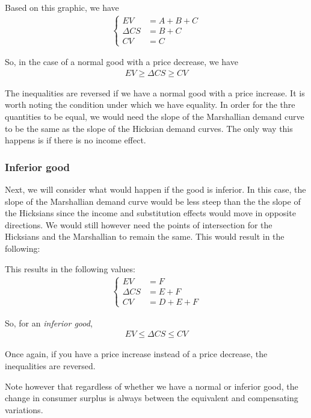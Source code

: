 Based on this graphic, we have
\begin{align*}
    \begin{cases}
        EV &= A + B + C \\
        \Delta CS &= B + C \\
        CV &= C
    \end{cases}
\end{align*}

So, in the case of a normal good with a price decrease, we have
\begin{align*}
    EV \geq \Delta CS \geq CV
\end{align*}

The inequalities are reversed if we have a normal good with a price increase. It is worth noting the condition under which we have equality. In order for the thre quantities to be equal, we would need the slope of the Marshallian demand curve to be the same as the slope of the Hicksian demand curves. The only way this happens is if there is no income effect.

\subsubsection*{Inferior good}
Next, we will consider what would happen if the good is inferior. In this case, the slope of the Marshallian demand curve would be less steep than the the slope of the Hicksians since the income and substitution effects would move in opposite directions. We would still however need the points of intersection for the Hicksians and the Marshallian to remain the same. This would result in the following:

This results in the following values:
\begin{align*}
    \begin{cases}
        EV &= F \\
        \Delta CS &= E + F \\
        CV &= D + E + F
    \end{cases}
\end{align*}

So, for an \emph{inferior good}, 
\begin{align*}
    EV \leq \Delta CS \leq CV
\end{align*}

Once again, if you have a price increase instead of a price decrease, the inequalities are reversed. 

Note however that regardless of whether we have a normal or inferior good, the change in consumer surplus is always between the equivalent and compensating variations. 

